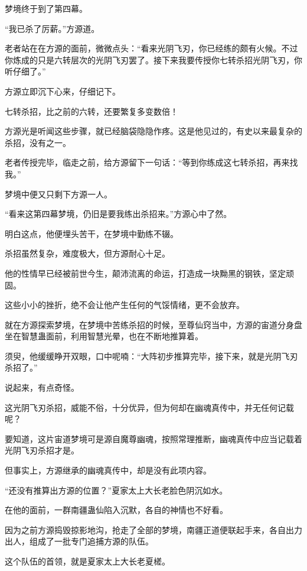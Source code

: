 
\begin{this_body}

梦境终于到了第四幕。

“我已杀了厉薪。”方源道。

老者站在在方源的面前，微微点头：“看来光阴飞刃，你已经练的颇有火候。不过你炼成的只是六转层次的光阴飞刃罢了。接下来我要传授你七转杀招光阴飞刃，你听仔细了。”

方源立即沉下心来，仔细记下。

七转杀招，比之前的六转，还要繁复多变数倍！

方源光是听闻这些步骤，就已经脑袋隐隐作疼。这是他见过的，有史以来最复杂的杀招，没有之一。

老者传授完毕，临走之前，给方源留下一句话：“等到你练成这七转杀招，再来找我。”

梦境中便又只剩下方源一人。

“看来这第四幕梦境，仍旧是要我练出杀招来。”方源心中了然。

明白这点，他便埋头苦干，在梦境中勤练不辍。

杀招虽然复杂，难度极大，但方源耐心十足。

他的性情早已经被前世今生，颠沛流离的命运，打造成一块黝黑的钢铁，坚定顽固。

这些小小的挫折，绝不会让他产生任何的气馁情绪，更不会放弃。

就在方源探索梦境，在梦境中苦练杀招的时候，至尊仙窍当中，方源的宙道分身盘坐在智慧蛊面前，利用智慧光晕，也在不断地推算着。

须臾，他缓缓睁开双眼，口中呢喃：“大阵初步推算完毕，接下来，就是光阴飞刃杀招了。”

说起来，有点奇怪。

这光阴飞刃杀招，威能不俗，十分优异，但为何却在幽魂真传中，并无任何记载呢？

要知道，这片宙道梦境可是源自魔尊幽魂，按照常理推断，幽魂真传中应当记载着光阴飞刃杀招才是。

但事实上，方源继承的幽魂真传中，却是没有此项内容。

“还没有推算出方源的位置？”夏家太上大长老脸色阴沉如水。

在他的面前，一群南疆蛊仙陷入沉默，各自的神情也不好看。

因为之前方源捣毁掠影地沟，抢走了全部的梦境，南疆正道便联起手来，各自出力出人，组成了一批专门追捕方源的队伍。

这个队伍的首领，就是夏家太上大长老夏槎。


\end{this_body}
